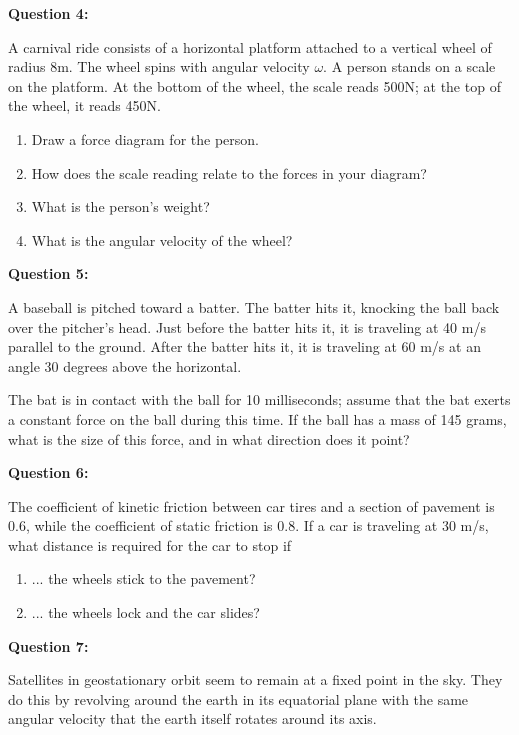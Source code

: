 \documentclass[12pt]{article}
\begin{document}
{\bf Question 4:}

A carnival ride consists of a horizontal platform attached to a vertical wheel of radius 8m. The wheel spins with angular velocity $\omega$.
A person stands on a scale on the platform. At the bottom of the wheel, the scale reads 500N; at the top of the wheel, it reads
450N.

\begin{enumerate}
  \item{Draw a force diagram for the person.}
  \item{How does the scale reading relate to the forces in your diagram?}
  \item{What is the person's weight?}
  \item{What is the angular velocity of the wheel?}
\end{enumerate}

\bigskip
\bigskip
\bigskip
\bigskip


{\bf Question 5:}

A baseball is pitched toward a batter. The batter hits it, knocking the ball back over the pitcher's head.
Just before the batter hits it, it is traveling at 40 m/s parallel to the ground. After the batter hits it, it is traveling at 60 m/s at an angle 30 degrees above the horizontal.

The bat is in contact with the ball for 10 milliseconds; assume that the bat exerts a constant force on the ball during this time. If the ball has a mass of 145 grams, what is the size of this force,
and in what direction does it point?

\bigskip
\bigskip
\bigskip
\bigskip


{\bf Question 6:}

The coefficient of kinetic friction between car tires and a section of pavement is 0.6, while the coefficient of static friction is 0.8. If a car is traveling at 30 m/s, what distance is required for the car to stop if

\begin{enumerate}
  \item{... the wheels stick to the pavement?}
  \item{... the wheels lock and the car slides?}
\end{enumerate}

\bigskip
\bigskip
\bigskip
\bigskip

{\bf Question 7:}

Satellites in geostationary orbit seem to remain at a fixed point in the sky. They do this by revolving around the earth in its equatorial plane with the same angular velocity that the earth itself rotates around its axis.
\end{document}
